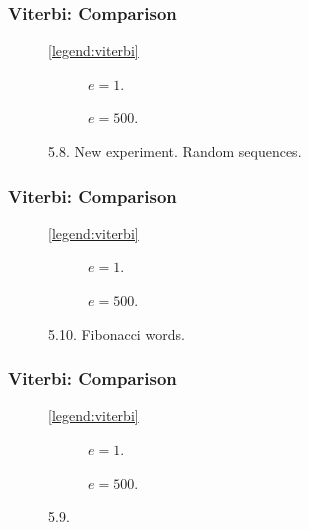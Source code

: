 \documentclass[english,notes]{beamer}
\begin{document}
\begin{frame}
  \frametitle{Viterbi: Comparison}
  \begin{figure}
    \centering\ref{legend:viterbi}\\
    \begin{subfigure}{0.5\textwidth}
      \centering 
      \caption{$e = 1$.}
    \end{subfigure}\hspace{-5mm}%
    \begin{subfigure}{0.5\textwidth}
      \centering 
      \caption{$e = 500$.}
    \end{subfigure}
    \caption{5.8. New experiment. Random sequences.}
  \end{figure}
\end{frame}

\begin{frame}
  \frametitle{Viterbi: Comparison}
  \begin{figure}
    \centering\ref{legend:viterbi}\\
    \begin{subfigure}[b]{0.5\textwidth}
      \centering 
      \caption{$e = 1$.}
    \end{subfigure}\hspace{-5mm}%
    \begin{subfigure}[b]{0.5\textwidth}
      \centering
      
      \caption{$e = 500$.}
    \end{subfigure}
    \caption{5.10. Fibonacci words.}
  \end{figure}
\end{frame}

\begin{frame}
  \frametitle{Viterbi: Comparison}
  \begin{figure}
    \centering\ref{legend:viterbi}\\
    \begin{subfigure}{0.5\textwidth}
      \centering 
      \caption{$e = 1$.}
    \end{subfigure}\hspace{-5mm}%
    \begin{subfigure}{0.5\textwidth}
      \centering 
      \caption{$e=500$.}
    \end{subfigure}
    \caption{5.9.}
  \end{figure}
\end{frame}
\end{document}
